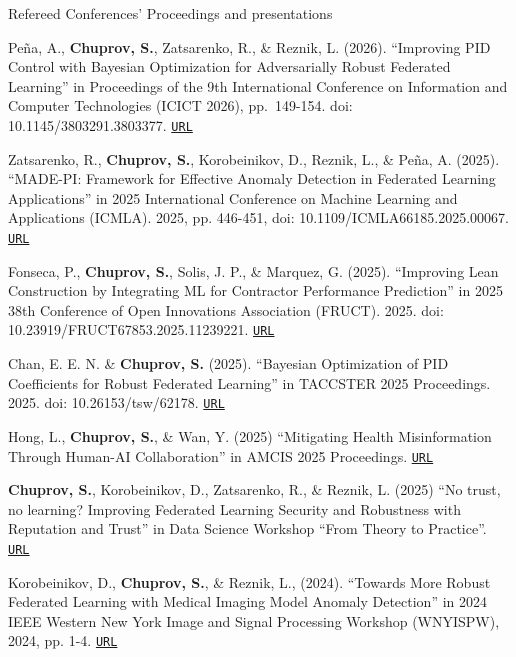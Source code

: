 \begin{rSection}{Refereed Conferences' Proceedings and presentations}
\begin{enumerate}[label=[C{{\arabic*}]}]
\item Peña, A., \textbf{Chuprov, S.}, Zatsarenko, R., \& Reznik, L. (2026). ``Improving PID Control with Bayesian Optimization for Adversarially Robust Federated Learning'' in Proceedings of the 9th International Conference on Information and Computer Technologies (ICICT 2026), pp.\ 149-154. doi: 10.1145/3803291.3803377. \href{https://doi.org/10.1145/3803291.3803377}{\nolinkurl{URL}}

\item Zatsarenko, R., \textbf{Chuprov, S.}, Korobeinikov, D., Reznik, L., \& Peña, A. (2025). ``MADE-PI: Framework for Effective Anomaly Detection in Federated Learning Applications'' in 2025 International Conference on Machine Learning and Applications (ICMLA). 2025, pp. 446-451, doi: 10.1109/ICMLA66185.2025.00067. \href{https://ieeexplore.ieee.org/abstract/document/11471394}{\nolinkurl{URL}}

\item Fonseca, P., \textbf{Chuprov, S.}, Solis, J. P., \& Marquez, G. (2025). ``Improving Lean Construction by Integrating ML for Contractor Performance Prediction'' in 2025 38th Conference of Open Innovations Association (FRUCT). 2025. doi: 10.23919/FRUCT67853.2025.11239221. \href{https://ieeexplore.ieee.org/abstract/document/11239221}{\nolinkurl{URL}}

\item Chan, E. E. N. \& \textbf{Chuprov, S.} (2025). ``Bayesian Optimization of PID Coefficients for Robust Federated Learning'' in TACCSTER 2025 Proceedings. 2025. doi: 10.26153/tsw/62178. \href{https://repositories.lib.utexas.edu/items/2b8f05db-3c70-4db8-9bdd-c37dc7566113}{\nolinkurl{URL}}

\item Hong, L., \textbf{Chuprov, S.}, \& Wan, Y. (2025) ``Mitigating Health Misinformation Through Human-AI Collaboration'' in AMCIS 2025 Proceedings. \href{https://aisel.aisnet.org/amcis2025/social_comput/social_comput/3}{\nolinkurl{URL}}

\item \textbf{Chuprov, S.}, Korobeinikov, D., Zatsarenko, R., \& Reznik, L. (2025) ``No trust, no learning? Improving Federated Learning Security and Robustness with Reputation and Trust'' in Data Science Workshop ``From Theory to Practice''. \href{https://openreview.net/forum?id=V58HuUXGai}{\nolinkurl{URL}}

\item Korobeinikov, D., \textbf{Chuprov, S.}, \& Reznik, L., (2024). ``Towards More Robust Federated Learning with Medical Imaging Model Anomaly Detection'' in 2024 IEEE Western New York Image and Signal Processing Workshop (WNYISPW), 2024, pp. 1-4.   
\href{https://ieeexplore.ieee.org/document/10786500}{\nolinkurl{URL}}


\end{enumerate}
\end{rSection}
